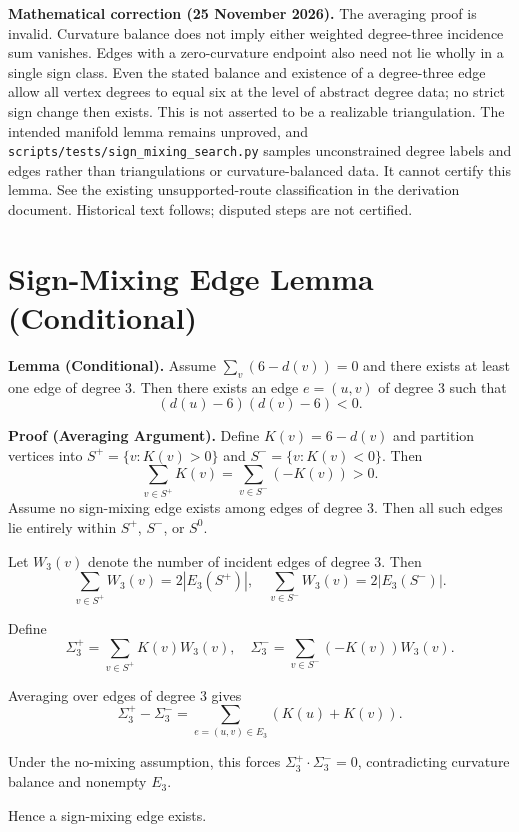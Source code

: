 \documentclass{article}
\begin{document}
\par\noindent\textbf{Mathematical correction (25 November 2026).} The averaging proof is invalid. Curvature balance does not imply either weighted degree-three incidence sum vanishes. Edges with a zero-curvature endpoint also need not lie wholly in a single sign class. Even the stated balance and existence of a degree-three edge allow all vertex degrees to equal six at the level of abstract degree data; no strict sign change then exists. This is not asserted to be a realizable triangulation. The intended manifold lemma remains unproved, and \texttt{scripts/tests/sign\_mixing\_search.py} samples unconstrained degree labels and edges rather than triangulations or curvature-balanced data. It cannot certify this lemma. See the existing unsupported-route classification in the derivation document. Historical text follows; disputed steps are not certified.\par


\section{Sign-Mixing Edge Lemma (Conditional)}

\textbf{Lemma (Conditional).}
Assume $\sum_{v}(6-d(v))=0$ and there exists at least one edge of degree $3$. Then there exists an edge $e=(u,v)$ of degree $3$ such that
\[
(d(u)-6)(d(v)-6)<0.
\]

\textbf{Proof (Averaging Argument).}
Define $K(v)=6-d(v)$ and partition vertices into $S^+=\{v:K(v)>0\}$ and $S^-=\{v:K(v)<0\}$. Then
\[
\sum_{v\in S^+}K(v)=\sum_{v\in S^-}(-K(v))>0.
\]
Assume no sign-mixing edge exists among edges of degree $3$. Then all such edges lie entirely within $S^+$, $S^-$, or $S^0$.

Let $W_3(v)$ denote the number of incident edges of degree $3$. Then
\[
\sum_{v\in S^+}W_3(v)=2|E_3(S^+)|,\quad
\sum_{v\in S^-}W_3(v)=2|E_3(S^-)|.
\]

Define
\[
\Sigma_3^+=\sum_{v\in S^+}K(v)W_3(v),\quad
\Sigma_3^-=\sum_{v\in S^-}(-K(v))W_3(v).
\]

Averaging over edges of degree $3$ gives
\[
\Sigma_3^+-\Sigma_3^-=\sum_{e=(u,v)\in E_3}(K(u)+K(v)).
\]

Under the no-mixing assumption, this forces $\Sigma_3^+\cdot \Sigma_3^-=0$, contradicting curvature balance and nonempty $E_3$.

Hence a sign-mixing edge exists.
\end{document}
